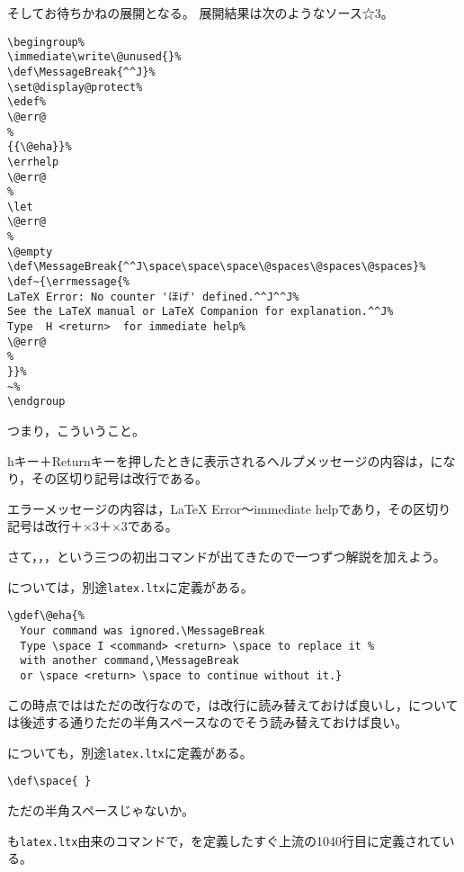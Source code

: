 \documentclass[autodetect-engine,dvipdfmx]{jsarticle}
\begin{document}
そしてお待ちかねの展開となる。
展開結果は次のようなソース☆3。
\texsource
\begin{lstlisting}
\begingroup%
\immediate\write\@unused{}%
\def\MessageBreak{^^J}%
\set@display@protect%
\edef%
\@err@                                                                 %
{{\@eha}}%
\errhelp
\@err@                                                                 %
\let
\@err@                                                                 %
\@empty
\def\MessageBreak{^^J\space\space\space\@spaces\@spaces\@spaces}%
\def~{\errmessage{%
LaTeX Error: No counter 'ほげ' defined.^^J^^J%
See the LaTeX manual or LaTeX Companion for explanation.^^J%
Type  H <return>  for immediate help%
\@err@                                                                 %
}}%
~%
\endgroup
\end{lstlisting}
つまり，こういうこと。

hキー＋Returnキーを押したときに表示されるヘルプメッセージの内容は，になり，その区切り記号は改行である。

エラーメッセージの内容は，LaTeX Error〜immediate helpであり，その区切り記号は改行＋$\times3$＋$\times3$である。

さて，，，という三つの初出コマンドが出てきたので一つずつ解説を加えよう。

については，別途\texttt{latex.ltx}に定義がある。

\latexltx
\begin{lstlisting}[firstnumber=1041]
\gdef\@eha{%
  Your command was ignored.\MessageBreak
  Type \space I <command> <return> \space to replace it %
  with another command,\MessageBreak
  or \space <return> \space to continue without it.}
\end{lstlisting}

この時点でははただの改行なので，は改行に読み替えておけば良いし，については後述する通りただの半角スペースなのでそう読み替えておけば良い。

についても，別途\texttt{latex.ltx}に定義がある。

\latexltx
\begin{lstlisting}[firstnumber=97]
\def\space{ }
\end{lstlisting}
ただの半角スペースじゃないか。

も\texttt{latex.ltx}由来のコマンドで，を定義したすぐ上流の1040行目に定義されている。
\end{document}
